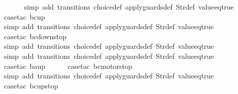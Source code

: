 \begin{isabellebody}
\ \ \ \ \ \isamarkupfalse%
\ {\isacharparenleft}simp\ add{\isacharcolon}\ transitions\ choice{\isacharunderscore}def\ apply{\isacharunderscore}guards{\isacharunderscore}def\ Str{\isacharunderscore}def\ value{\isacharunderscore}eq{\isacharunderscore}true{\isacharparenright}\isanewline
\ \ \ \ \isamarkupfalse%
\ {\isacharparenleft}case{\isacharunderscore}tac\ {\isachardoublequoteopen}bc{\isacharequal}up{}{}{\isachardoublequoteclose}{\isacharparenright}\isanewline
\ \ \ \ \ \isamarkupfalse%
\ {\isacharparenleft}simp\ add{\isacharcolon}\ transitions\ choice{\isacharunderscore}def\ apply{\isacharunderscore}guards{\isacharunderscore}def\ Str{\isacharunderscore}def\ value{\isacharunderscore}eq{\isacharunderscore}true{\isacharparenright}\isanewline
\ \ \ \ \isamarkupfalse%
\ {\isacharparenleft}case{\isacharunderscore}tac\ {\isachardoublequoteopen}bc{\isacharequal}down{}{}stop{\isachardoublequoteclose}{\isacharparenright}\isanewline
\ \ \ \ \ \isamarkupfalse%
\ {\isacharparenleft}simp\ add{\isacharcolon}\ transitions\ choice{\isacharunderscore}def\ apply{\isacharunderscore}guards{\isacharunderscore}def\ Str{\isacharunderscore}def\ value{\isacharunderscore}eq{\isacharunderscore}true{\isacharparenright}\isanewline
\ \ \ \ \isamarkupfalse%
\ {\isacharparenleft}simp\ add{\isacharcolon}\ transitions\ choice{\isacharunderscore}def\ apply{\isacharunderscore}guards{\isacharunderscore}def\ Str{\isacharunderscore}def\ value{\isacharunderscore}eq{\isacharunderscore}true{\isacharparenright}\isanewline
\ \ \ \isamarkupfalse%
\ {\isacharparenleft}case{\isacharunderscore}tac\ {\isachardoublequoteopen}ba{\isacharequal}up{}{}{\isachardoublequoteclose}{\isacharparenright}\isanewline
\ \ \ \ \isamarkupfalse%
\ {\isacharparenleft}case{\isacharunderscore}tac\ {\isachardoublequoteopen}bc{\isacharequal}motorstop{}{\isachardoublequoteclose}{\isacharparenright}\isanewline
\ \ \ \ \ \isamarkupfalse%
\ {\isacharparenleft}simp\ add{\isacharcolon}\ transitions\ choice{\isacharunderscore}def\ apply{\isacharunderscore}guards{\isacharunderscore}def\ Str{\isacharunderscore}def\ value{\isacharunderscore}eq{\isacharunderscore}true{\isacharparenright}\isanewline
\ \ \ \ \isamarkupfalse%
\ {\isacharparenleft}case{\isacharunderscore}tac\ {\isachardoublequoteopen}bc{\isacharequal}up{}{}stop{\isachardoublequoteclose}{\isacharparenright}\isanewline

\end{isabellebody}
